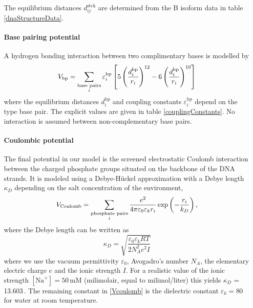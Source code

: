 The equilibrium distances $d_{ij}^\text{stck}$ are determined from the B isoform data in table \ref{dnaStructureData}.


\paragraph{Base pairing potential}
A hydrogen bonding interaction between two complimentary bases is modelled by
\begin{equation}
V_\text{bp}
= \sum_{\substack{\text{base pairs}\\i}}
\varepsilon^\text{bp}_i \left[
	  5\left(\frac{d^\text{bp}_i}{r_i} \right)^{12}
	- 6\left(\frac{d^\text{bp}_i}{r_i} \right)^{10}
\right]
\end{equation}
where the equilibrium distances $d^\text{bp}_i$ and coupling constants $\varepsilon^\text{bp}_i$ depend on the type base pair. The explicit values are given in table \ref{couplingConstants}. No interaction is assumed between non-complementary base pairs.


\paragraph{Coulombic potential}
The final potential in our model is the screened electrostatic Coulomb interaction between the charged phosphate groups situated on the backbone of the DNA strands. It is modeled using a Debye-H\"uckel approximation with a Debye length $\kappa_D$ depending on the salt concentration of the environment,
\begin{equation}
V_\text{Coulomb}
= \sum_{\substack{\text{phosphate pairs}\\i}}
	\frac{e^2}{4 \pi \varepsilon_0 \varepsilon_k r_i}
       		\exp \left(- \frac{r_i}{k_D} \right),
\label{Vcoulomb}
\end{equation}
where the Debye length can be written as
\begin{equation}
\kappa_D
= \sqrt{ \frac{\varepsilon_0 \varepsilon_k RT}{2N^2_A e^2 I}}
\end{equation}
where we use the vacuum permittivity $\varepsilon_0$, Avogadro's number $N_A$, the elementary electric charge $e$ and the ionic strength $I$. For a realistic value of the ionic strength $[\text{Na}^+] = 50$\,mM (milimolair, equal to milimol/liter) this yields $\kappa_D$ = 13.603\,\Angstrom. The remaining constant in \eqref{Vcoulomb} is the dielectric constant $\varepsilon_k = 80$ for water at room temperature.


